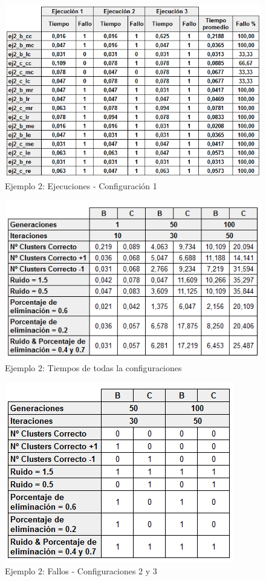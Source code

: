 \documentclass[conference,a4paper]{IEEEtran}
\begin{document}
\begin{figure}[H]
\centering
\includegraphics[scale=0.5]{Experimentacion/Ejemplo2/Ejemplo2Ejecuciones}
\caption{Ejemplo 2: Ejecuciones - Configuración 1\\}
\end{figure}

\begin{figure}[H]
\centering
\includegraphics[scale=0.6]{Experimentacion/Ejemplo2/Ejemplo2Completo}
\caption{Ejemplo 2: Tiempos de todas la configuraciones\\}
\end{figure}

\begin{figure}[H]
\centering
\includegraphics[scale=0.7]{Experimentacion/Ejemplo2/Ejemplo2Fallos}
\caption{Ejemplo 2: Fallos - Configuraciones 2 y 3\\}
\end{figure}
\end{document}
